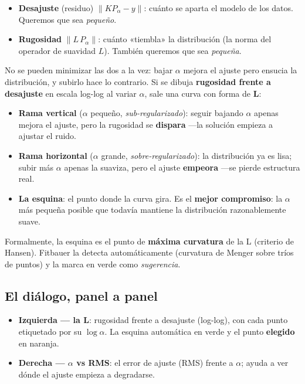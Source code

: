 \begin{itemize}[nosep]
  \item \textbf{Desajuste} (residuo) $\lVert K P_\alpha - y\rVert$: cuánto se
        aparta el modelo de los datos. Queremos que sea \emph{pequeño}.
  \item \textbf{Rugosidad} $\lVert L\,P_\alpha\rVert$: cuánto «tiembla» la
        distribución (la norma del operador de suavidad $L$). También queremos
        que sea \emph{pequeña}.
\end{itemize}

No se pueden minimizar las dos a la vez: bajar $\alpha$ mejora el ajuste pero
ensucia la distribución, y subirlo hace lo contrario. Si se dibuja
\textbf{rugosidad frente a desajuste} en escala log-log al variar $\alpha$, sale
una curva con forma de \textbf{L}:

\begin{itemize}[nosep]
  \item \textbf{Rama vertical} ($\alpha$ pequeño, \emph{sub-regularizado}):
        seguir bajando $\alpha$ apenas mejora el ajuste, pero la rugosidad se
        \textbf{dispara} —la solución empieza a ajustar el ruido.
  \item \textbf{Rama horizontal} ($\alpha$ grande, \emph{sobre-regularizado}):
        la distribución ya es lisa; subir más $\alpha$ apenas la suaviza, pero el
        ajuste \textbf{empeora} —se pierde estructura real.
  \item \textbf{La esquina}: el punto donde la curva gira. Es el
        \textbf{mejor compromiso}: la $\alpha$ más pequeña posible que todavía
        mantiene la distribución razonablemente suave.
\end{itemize}

Formalmente, la esquina es el punto de \textbf{máxima curvatura} de la L
(criterio de Hansen). Fitbauer la detecta automáticamente (curvatura de Menger
sobre tríos de puntos) y la marca en \textcolor{fbgreen}{verde} como
\emph{sugerencia}.

\subsection{El diálogo, panel a panel}

\begin{itemize}[nosep]
  \item \textbf{Izquierda — la L}: rugosidad frente a desajuste (log-log), con
        cada punto etiquetado por su $\log\alpha$. La esquina automática en verde
        y el punto \textbf{elegido} en \textcolor{fbred}{naranja}.
  \item \textbf{Derecha — $\alpha$ vs RMS}: el error de ajuste (RMS) frente a
        $\alpha$; ayuda a ver dónde el ajuste empieza a degradarse.
\end{itemize}

